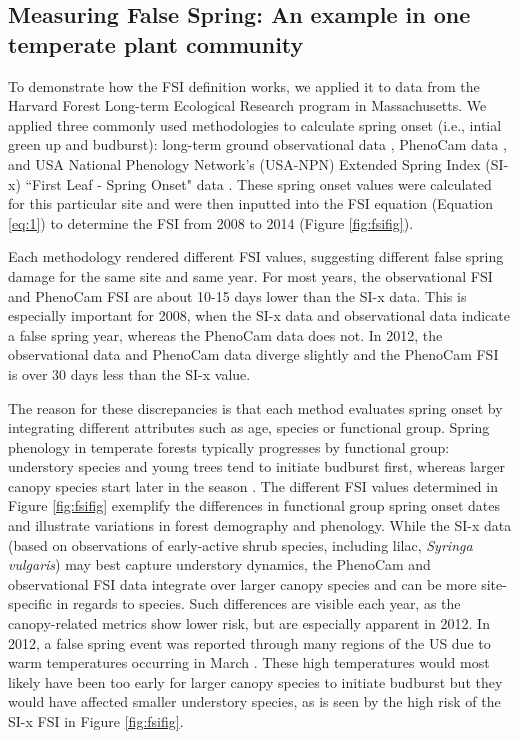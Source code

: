 \documentclass{article}\usepackage[]{graphicx}\usepackage[]{color}
\begin{document}
\subsection*{Measuring False Spring: An example in one temperate plant community}
To demonstrate how the FSI definition works, we applied it to data from the Harvard Forest Long-term Ecological Research program in Massachusetts. We applied three commonly used methodologies to calculate spring onset (i.e., intial green up and budburst): long-term ground observational data \citep{Okeefe2014}, PhenoCam data \citep{Richardson2015}, and USA National Phenology Network's (USA-NPN) Extended Spring Index (SI-x) ``First Leaf - Spring Onset" data \citep{USA-NPN2016}. These spring onset values were calculated for this particular site and were then inputted into the FSI equation (Equation \ref{eq:1}) to determine the FSI from 2008 to 2014 (Figure \ref{fig:fsifig}). 

Each methodology rendered different FSI values, suggesting different false spring damage for the same site and same year. For most years, the observational FSI and PhenoCam FSI are about 10-15 days lower than the SI-x data. This is especially important for 2008, when the SI-x data and observational data indicate a false spring year, whereas the PhenoCam data does not. In 2012, the observational data and PhenoCam data diverge slightly and the PhenoCam FSI is over 30 days less than the SI-x value.

The reason for these discrepancies is that each method evaluates spring onset by integrating different attributes such as age, species or functional group. Spring phenology in temperate forests typically progresses by functional group: understory species and young trees tend to initiate budburst first, whereas larger canopy species start later in the season \citep{Richardson2009, Xin2016}. The different FSI values determined in Figure \ref{fig:fsifig} exemplify the differences in functional group spring onset dates and illustrate variations in forest demography and phenology. While the SI-x data (based on observations of early-active shrub species, including lilac, \emph{Syringa vulgaris}) may best capture understory dynamics, the PhenoCam and observational FSI data integrate over larger canopy species and can be more site-specific in regards to species. Such differences are visible each year, as the canopy-related metrics show lower risk, but are especially apparent in 2012. In 2012, a false spring event was reported through many regions of the US due to warm temperatures occurring in March \citep{Ault2015}. These high temperatures would most likely have been too early for larger canopy species to initiate budburst but they would have affected smaller understory species, as is seen by the high risk of the SI-x FSI in Figure \ref{fig:fsifig}. 
\end{document}
